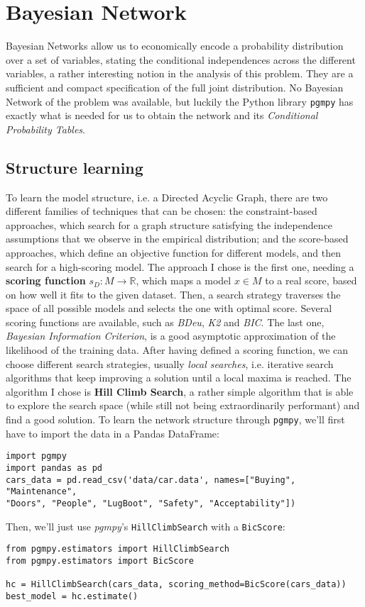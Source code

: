 \section{Bayesian Network}
\label{sec:bayesiannet}
Bayesian Networks allow us to economically encode a probability distribution over a set of variables, stating the conditional independences across the different variables, a rather interesting notion in the analysis of this problem. They are a sufficient and compact specification of the full joint distribution. No Bayesian Network of the problem was available, but luckily the Python library \texttt{pgmpy} has exactly what is needed for us to obtain the network and its \textit{Conditional Probability Tables}.
\subsection{Structure learning}
To learn the model structure, i.e. a Directed Acyclic Graph, there are two different families of techniques that can be chosen: the constraint-based approaches, which search for a graph structure satisfying the independence assumptions that we observe in the empirical distribution; and the score-based approaches, which define an objective function for different models, and then search for a high-scoring model. \cite{book:probgraphmod}
The approach I chose is the first one, needing a \textbf{scoring function} $s_D: M \rightarrow \mathbb{R}$, which maps a model $x \in M$ to a real score, based on how well it fits to the given dataset. Then, a search strategy traverses the space of all possible models and selects the one with optimal score. Several scoring functions are available, such as \textit{BDeu}, \textit{K2} and \textit{BIC}. The last one, \textit{Bayesian Information Criterion}, is a good asymptotic approximation of the likelihood of the training data. After having defined a scoring function, we can choose different search strategies, usually \textit{local searches}, i.e. iterative search algorithms that keep improving a solution until a local maxima is reached. The algorithm I chose is \textbf{Hill Climb Search}, a rather simple algorithm that is able to explore the search space (while still not being extraordinarily performant) and find a good solution. 
To learn the network structure through \texttt{pgmpy}, we'll first have to import the data in a Pandas DataFrame:
\begin{verbatim}
import pgmpy
import pandas as pd
cars_data = pd.read_csv('data/car.data', names=["Buying", "Maintenance",
"Doors", "People", "LugBoot", "Safety", "Acceptability"])
\end{verbatim}
Then, we'll just use \textit{pgmpy}'s \texttt{HillClimbSearch} with a \texttt{BicScore}:
\begin{verbatim}
from pgmpy.estimators import HillClimbSearch
from pgmpy.estimators import BicScore

hc = HillClimbSearch(cars_data, scoring_method=BicScore(cars_data))
best_model = hc.estimate()
\end{verbatim}

